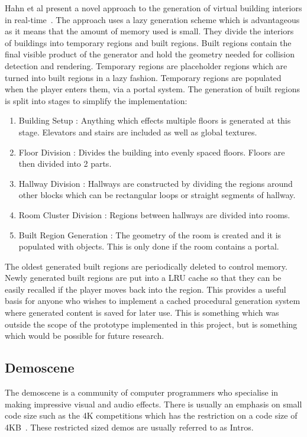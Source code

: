 Hahn et al present a novel approach to the generation of virtual building interiors in real-time~\cite{hahn2006persistent}.
The approach uses a lazy generation scheme which is advantageous as it means that the amount of memory used is small. 
They divide the interiors of buildings into temporary regions and built regions.
Built regions contain the final visible product of the generator and hold the geometry needed for collision detection and rendering.
Temporary regions are placeholder regions which are turned into built regions in a lazy fashion.
Temporary regions are populated when the player enters them, via a portal system.
The generation of built regions is split into stages to simplify the implementation:
\begin{enumerate}
	\item Building Setup : Anything which effects multiple floors is generated at this stage. Elevators and stairs are included as well as global textures.
	\item Floor Division : Divides the building into evenly spaced floors. Floors are then divided into 2 parts.
	\item Hallway Division : Hallways are constructed by dividing the regions around other blocks which can be rectangular loops or straight segments of hallway. 
	\item Room Cluster Division : Regions between hallways are divided into rooms. 
	\item Built Region Generation : The geometry of the room is created and it is populated with objects. This is only done if the room contains a portal.
\end{enumerate}

The oldest generated built regions are periodically deleted to control memory. 
Newly generated built regions are put into a LRU cache so that they can be easily recalled if the player moves back into the region.
This provides a useful basis for anyone who wishes to implement a cached procedural generation system where generated content is saved for later use.
This is something which was outside the scope of the prototype implemented in this project, but is something which would be possible for future research.

\subsection{Demoscene}
The demoscene is a community of computer programmers who specialise in making impressive visual and audio effects.
There is usually an emphasis on small code size such as the 4K competitions which has the restriction on a code size of 4KB~\cite{web:demoscene4k}.
These restricted sized demos are usually referred to as Intros.

